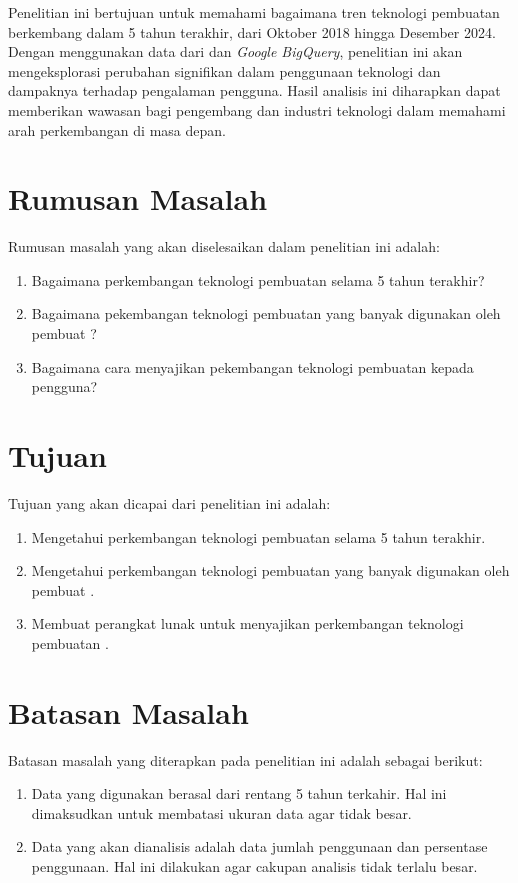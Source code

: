 Penelitian ini bertujuan untuk memahami bagaimana tren teknologi pembuatan \web berkembang dalam 5 tahun terakhir, dari Oktober 2018 hingga Desember 2024. Dengan menggunakan data dari \http dan \textit{Google BigQuery}, penelitian ini akan mengeksplorasi perubahan signifikan dalam penggunaan teknologi \web dan dampaknya terhadap pengalaman pengguna. Hasil analisis ini diharapkan dapat memberikan wawasan bagi pengembang \web dan industri teknologi dalam memahami arah perkembangan \web di masa depan.
    
\section{Rumusan Masalah}
	Rumusan masalah yang akan diselesaikan dalam penelitian ini adalah:
    \begin{enumerate}
        \item Bagaimana perkembangan teknologi pembuatan \web selama 5 tahun terakhir?
        \item Bagaimana pekembangan teknologi pembuatan \web yang banyak digunakan oleh pembuat \web?
        \item Bagaimana cara menyajikan pekembangan teknologi pembuatan \web kepada pengguna?
    \end{enumerate}
	
\section{Tujuan}
	Tujuan yang akan dicapai dari penelitian ini adalah:
    \begin{enumerate}
        \item Mengetahui perkembangan teknologi pembuatan \web selama 5 tahun terakhir.
        \item Mengetahui perkembangan teknologi pembuatan \web yang banyak digunakan oleh pembuat \web.
        \item Membuat perangkat lunak untuk menyajikan perkembangan teknologi pembuatan \web.
    \end{enumerate}
\section{Batasan Masalah}
\label{sec:batasan}
Batasan masalah yang diterapkan pada penelitian ini adalah sebagai berikut:
\begin{enumerate}
    \item Data yang digunakan berasal dari rentang 5 tahun terkahir. Hal ini dimaksudkan untuk membatasi ukuran data agar tidak besar.
    \item Data yang akan dianalisis adalah data jumlah penggunaan dan persentase penggunaan. Hal ini dilakukan agar cakupan analisis tidak terlalu besar.
\end{enumerate}

